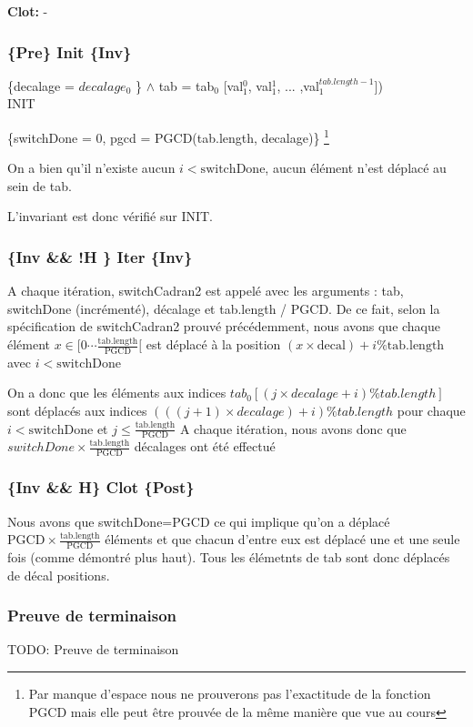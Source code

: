\noindent \textbf{Clot: } - \\

\subsubsection*{\{Pre\} Init \{Inv\}}

\{decalage = $decalage_{0}$ \}
$\wedge$ tab = tab$_{0}$ [val$_{1}^{0}$, val$_{1}^{1}$, ... ,val$_{1}^{tab.length-1}$])\\

INIT

\{switchDone = 0, pgcd = PGCD(tab.length, decalage)\} \footnote{Par manque d'espace nous ne prouverons pas l'exactitude de la fonction PGCD mais elle peut être prouvée de la même manière que vue au cours}

On a bien qu'il n'existe aucun $i < \mathrm{switchDone}$, aucun élément n'est déplacé au sein de tab.

L'invariant est donc vérifié sur INIT.

\subsubsection*{\{Inv \&\& !H \} Iter \{Inv\}}

A chaque itération, switchCadran2 est appelé avec les arguments : tab,
switchDone (incrémenté), décalage et tab.length / PGCD. De ce fait,
selon la spécification de switchCadran2 prouvé précédemment, nous avons
que chaque élément $x \in [0\cdots
    \frac{\mathrm{tab.length}}{\mathrm{PGCD}}[$ est déplacé à la
        position $(x\times \mathrm{decal})+i \% \mathrm{tab.length}$ avec $i < \mathrm{switchDone}$

On a donc que les éléments aux indices $tab_{0}[(j \times decalage + i) \% tab.length]$ sont déplacés aux indices $(((j+1)\times decalage)+i) \% tab.length$ pour chaque $i < \mathrm{switchDone}$ et $j \leq \frac{\mathrm{tab.length}}{\mathrm{PGCD}}$ 
A chaque itération, nous avons donc que $switchDone \times \frac {\mathrm{tab.length}}{\mathrm{PGCD}}$ décalages ont été effectué
\subsubsection*{\{Inv \&\& H\} Clot \{Post\}}

 Nous avons que switchDone=PGCD ce qui implique qu'on a déplacé
$\mathrm{PGCD}\times \frac{\mathrm{tab.length}}{\mathrm{PGCD}}$ éléments et
que chacun d'entre eux est déplacé une et une seule fois (comme démontré
plus haut). Tous les élémetnts de tab sont donc déplacés de décal positions.

\subsubsection*{Preuve de terminaison}
TODO: Preuve de terminaison
